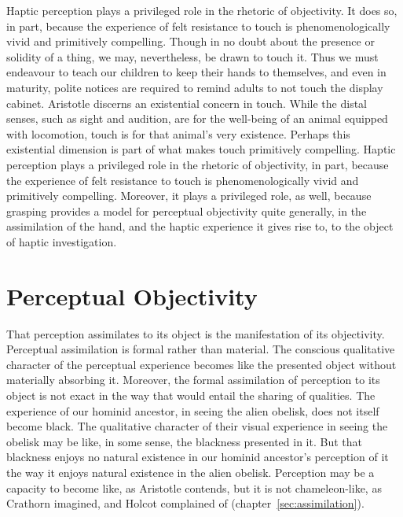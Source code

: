 Haptic perception plays a privileged role in the rhetoric of objectivity. It does so, in part, because the experience of felt resistance to touch is phenomenologically vivid and primitively compelling. Though in no doubt about the presence or solidity of a thing, we may, nevertheless, be drawn to touch it. Thus we must endeavour to teach our children to keep their hands to themselves, and even in maturity, polite notices are required to remind adults to not touch the display cabinet. Aristotle discerns an existential concern in touch. While the distal senses, such as sight and audition, are for the well-being of an animal equipped with locomotion, touch is for that animal's very existence. Perhaps this existential dimension is part of what makes touch primitively compelling. Haptic perception plays a privileged role in the rhetoric of objectivity, in part, because the experience of felt resistance to touch is phenomenologically vivid and primitively compelling. Moreover, it plays a privileged role, as well, because grasping provides a model for perceptual objectivity quite generally, in the assimilation of the hand, and the haptic experience it gives rise to, to the object of haptic investigation.


\section{Perceptual Objectivity} %
\label{sec:perceptual_objectivity}

That perception assimilates to its object is the manifestation of its objectivity. Perceptual assimilation is formal rather than material. The conscious qualitative character of the perceptual experience becomes like the presented object without materially absorbing it. Moreover, the formal assimilation of perception to its object is not exact in the way that would entail the sharing of qualities. The experience of our hominid ancestor, in seeing the alien obelisk, does not itself become black. The qualitative character of their visual experience in seeing the obelisk may be like, in some sense, the blackness presented in it. But that blackness enjoys no natural existence in our hominid ancestor's perception of it the way it enjoys natural existence in the alien obelisk. Perception may be a capacity to become like, as Aristotle contends, but it is not chameleon-like, as Crathorn imagined, and Holcot complained of (chapter~\ref{sec:assimilation}). 

